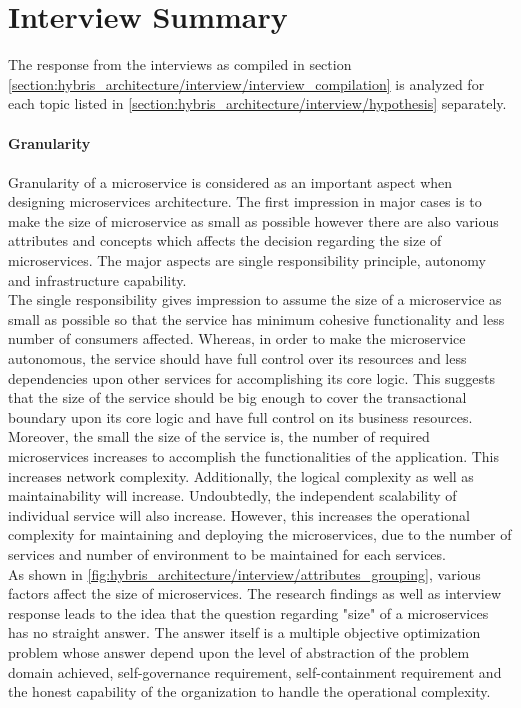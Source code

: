  \section{Interview Summary}\label{section:hybris_architecture/interview_summary}
 The response from the interviews as compiled in section \ref{section:hybris_architecture/interview/interview_compilation} is analyzed for each topic listed in \ref{section:hybris_architecture/interview/hypothesis} separately.
 \\
 \\
 \textbf{Granularity}
 \\
 \\
Granularity of a microservice is considered as an important aspect when designing microservices architecture. The first impression in major cases is to make the size of microservice as small as possible however there are also various attributes and concepts which affects the decision regarding the size of microservices. The major aspects are single responsibility principle, autonomy and infrastructure capability.
\\
The single responsibility gives impression to assume the size of a microservice as small as possible so that the service has minimum cohesive functionality and less number of consumers affected. Whereas, in order to make the microservice autonomous, the service should have full control over its resources and less dependencies upon other services for accomplishing its core logic. This suggests that the size of the service should be big enough to cover the transactional boundary upon its core logic and have full control on its business resources. 
\\
Moreover, the small the size of the service is, the number of required microservices increases to accomplish the functionalities of the application. This increases network complexity. Additionally, the logical complexity as well as maintainability will increase. Undoubtedly, the independent scalability of individual service will also increase. However, this increases the operational complexity for maintaining and deploying the microservices, due to the number of services and number of environment to be maintained for each services.
\\
As shown in \ref{fig:hybris_architecture/interview/attributes_grouping}, various factors affect the size of microservices.
The research findings as well as interview response leads to the idea that the question regarding "size" of a microservices has no straight answer. The answer itself is a multiple objective optimization problem whose answer depend upon the level of abstraction of the problem domain achieved, self-governance requirement, self-containment requirement and the honest capability of the organization to handle the operational complexity.
